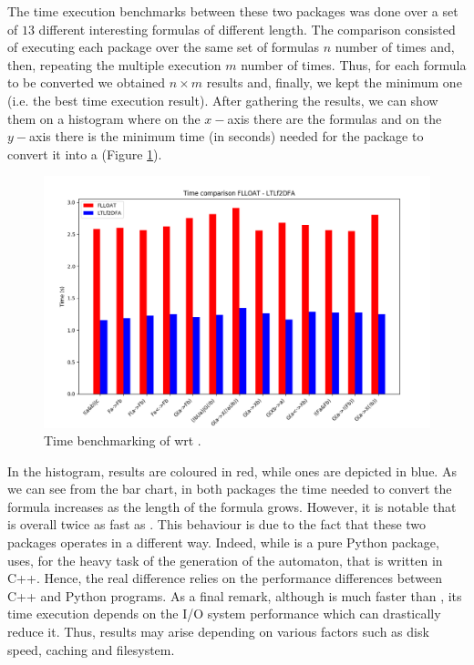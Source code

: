 The time execution benchmarks between these two packages was done over a set of $13$ different interesting \LTLf formulas of different length.
The comparison consisted of executing each package over the same set of formulas $n$ number of times and, then, repeating the multiple execution $m$ number of times. Thus, for each formula to be converted we obtained $n \times m$ results and, finally, we kept the minimum one (i.e. the best time execution result).
After gathering the results, we can show them on a histogram where on the $x-$axis there are the \LTLf formulas and on the $y-$axis there is the minimum time (in seconds) needed for the package to convert it into a \DFA (Figure \ref{fig:time-comparison}).
\begin{figure}[h]
\centering
\includegraphics[width=\linewidth]{images/time-comparison.png}
\caption{Time benchmarking of \LTLfToDFA wrt \FLLOAT.} 
\label{fig:time-comparison}
\end{figure}
In the histogram, \FLLOAT results are coloured in red, while \LTLfToDFA ones are depicted in blue. As we can see from the bar chart, in both packages the time needed to convert the formula increases as the length of the formula grows. However, it is notable that \LTLfToDFA is overall twice as fast as  \FLLOAT.
This behaviour is due to the fact that these two packages operates in a different way. Indeed, while \FLLOAT is a pure Python package, \LTLfToDFA uses, for the heavy task of the generation of the automaton, \MONA that is written in C++. Hence, the real difference relies on the performance differences between C++ and Python programs.
As a final remark, although \LTLfToDFA is much faster than \FLLOAT, its time execution depends on the I/O system performance which can drastically reduce it. Thus, \LTLfToDFA results may arise depending on various factors such as disk speed, caching and filesystem.
